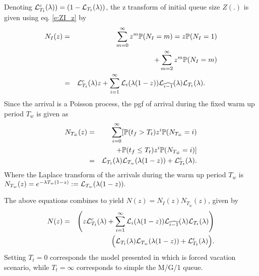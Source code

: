 \documentclass[journal]{IEEEtran}
\newcommand {\bear} {\begin{eqnarray}}
\newcommand {\eear} {\end{eqnarray}}
\def \P{{\mathbb P}}
\begin{document}
Denoting ${\cal L}^c_{T_t}(\lambda))=(1-{\cal L}_{T_t}(\lambda))$, the z transform of initial queue size $Z(.)$ is given using eq. \eqref{e:ZI_z} by
\bear
\nonumber N_I(z)&=&\sum_{m=0}^{\infty}z^m \P(N_I=m)=z\P(N_I=1)\\
&&\nonumber +\sum_{m=2}^\infty z^m \P(N_I=m) \\
&=&{\cal L}^c_{T_t}(\lambda) z+\sum_{i=1}^{\infty} {\cal
L}_{i}(\lambda(1-z)) {\cal
L}_{\widehat{i-1}}(\lambda){\cal L}_{T_t}(\lambda). \hspace{6mm}\eear
Since the arrival is a Poisson process, the pgf of arrival during the fixed warm up period $T_w$ is given as
\bear N_{T_{\tilde{w}}}(z)\nonumber&=&\sum_{i=0}^\infty[\P(t_f>T_t)z^i\P(N_{T_{\tilde{w}}}=i)\\
&&\nonumber+\P(t_f\leq T_t)z^i\P(N_{T_{\tilde{w}}}=i)]\\
&=& {\cal L}_{T_t}(\lambda){\cal
L}_{T_w}(\lambda(1-z))+ {\cal L}^c_{T_t}(\lambda).\eear
Where the Laplace transform of the arrivals during the warm up period $T_w$ is
$
N_{T_{{w}}}(z)=
e^{-\lambda T_w(1-z)}:={\cal L}_{T_w}(\lambda(1-z)). $

The above equations combines to yield $N(z)=N_I(z)N_{T_{\tilde{w}}}(z)$, given by
\bear \label{e:Zz}
\nonumber N(z)&=&\left(z {\cal L}^c_{T_t}(\lambda)+\sum_{i=1}^{\infty}
{\cal L}_{i}(\lambda(1-z)) {\cal
L}_{\widehat{i-1}}(\lambda){\cal L}_{T_t}(\lambda)\right)\\&&~\Big({\cal L}_{T_t}(\lambda){\cal
L}_{T_w}(\lambda(1-z))+ {\cal L}^c_{T_t}(\lambda)\Big).\eear
Setting $T_t=0$ corresponds the model presented in \cite{Qest08} which is forced vacation scenario, while $T_t=\infty$ corresponds to simple the M/G/1 queue. 
\end{document}
